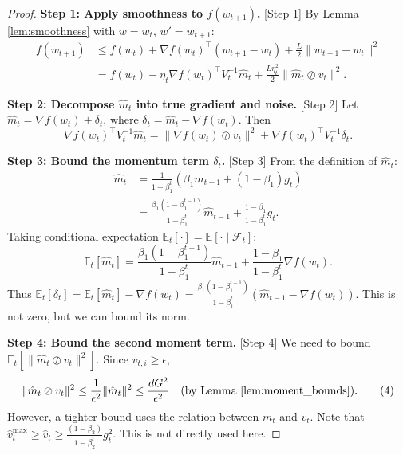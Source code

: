 \documentclass{article}
\begin{document}
\begin{proof}
\textbf{Step 1: Apply smoothness to $f(w_{t+1})$.} [Step 1]
By Lemma \ref{lem:smoothness} with $w = w_t$, $w' = w_{t+1}$:
\begin{align}
    f(w_{t+1}) &\le f(w_t) + \nabla f(w_t)^\top (w_{t+1} - w_t) + \frac{L}{2} \|w_{t+1} - w_t\|^2 \\
    &= f(w_t) - \eta_t \nabla f(w_t)^\top V_t^{-1} \hat{m}_t + \frac{L \eta_t^2}{2} \|\hat{m}_t \oslash v_t\|^2. \tag{1}
\end{align}

\textbf{Step 2: Decompose $\hat{m}_t$ into true gradient and noise.} [Step 2]
Let $\hat{m}_t = \nabla f(w_t) + \delta_t$, where $\delta_t = \hat{m}_t - \nabla f(w_t)$. Then
\begin{equation}
    \nabla f(w_t)^\top V_t^{-1} \hat{m}_t = \|\nabla f(w_t) \oslash v_t\|^2 + \nabla f(w_t)^\top V_t^{-1} \delta_t. \tag{2}
\end{equation}

\textbf{Step 3: Bound the momentum term $\delta_t$.} [Step 3]
From the definition of $\hat{m}_t$:
\begin{align}
    \hat{m}_t &= \frac{1}{1-\beta_1^t} \left( \beta_1 m_{t-1} + (1-\beta_1) g_t \right) \\
    &= \frac{\beta_1 (1-\beta_1^{t-1})}{1-\beta_1^t} \hat{m}_{t-1} + \frac{1-\beta_1}{1-\beta_1^t} g_t.
\end{align}
Taking conditional expectation $\mathbb{E}_t[\cdot] = \mathbb{E}[\cdot \mid \mathcal{F}_t]$:
\begin{equation}
    \mathbb{E}_t[\hat{m}_t] = \frac{\beta_1 (1-\beta_1^{t-1})}{1-\beta_1^t} \hat{m}_{t-1} + \frac{1-\beta_1}{1-\beta_1^t} \nabla f(w_t). \tag{3}
\end{equation}
Thus $\mathbb{E}_t[\delta_t] = \mathbb{E}_t[\hat{m}_t] - \nabla f(w_t) = \frac{\beta_1 (1-\beta_1^{t-1})}{1-\beta_1^t} (\hat{m}_{t-1} - \nabla f(w_t))$. This is not zero, but we can bound its norm.

\textbf{Step 4: Bound the second moment term.} [Step 4]
We need to bound $\mathbb{E}_t[\|\hat{m}_t \oslash v_t\|^2]$. Since $v_{t,i} \ge \epsilon$,
\begin{equation}
    \|\hat{m}_t \oslash v_t\|^2 \le \frac{1}{\epsilon^2} \|\hat{m}_t\|^2 \le \frac{d G^2}{\epsilon^2} \quad \text{(by Lemma \ref{lem:moment_bounds})}. \tag{4}
\end{equation}
However, a tighter bound uses the relation between $m_t$ and $v_t$. Note that $\hat{v}_t^{\text{max}} \ge \hat{v}_t \ge \frac{(1-\beta_2)}{1-\beta_2^t} g_t^2$. This is not directly used here.


\end{proof}
\end{document}
